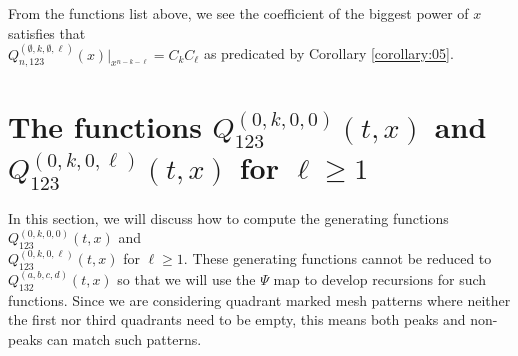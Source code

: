\documentclass[
final,nomarks
]{dmtcs-episciences}
\newcommand{\coref}[1]{Corollary \ref{corollary:#1}}
\newcommand{\Qmm}[1]{Q_{132}^{(#1)}(t,x)}
\newcommand{\Qm}[1]{Q_{123}^{(#1)}(t,x)}
\newcommand{\Qmn}[2]{Q_{#2,123}^{(#1)}(x)}
\begin{document}
From the functions list above, we see the coefficient of the biggest power of \begin{math}x\end{math} satisfies that\\ \begin{math}\Qmn{\emptyset,k,\emptyset,\ell}{n}\big\vert_{x^{n-k-\ell}}=C_k C_\ell\end{math} as predicated by \coref{05}.






\section{The functions \(\Qm{0,k,0,0}\) and \(\Qm{0,k,0,\ell}\) for \(\ell\geq 1\)}
In this section, we will discuss how to compute the generating functions 
\begin{math}\Qm{0,k,0,0}\end{math} and\\
\begin{math}\Qm{0,k,0,\ell}\end{math} for \begin{math}\ell\geq 1\end{math}. These generating functions 
cannot be reduced to \begin{math}\Qmm{a,b,c,d}\end{math} so that we will use the \begin{math}\Psi\end{math} map to 
develop recursions for such functions. Since we are considering 
quadrant marked mesh patterns where neither the first nor third quadrants need to be empty, 
this means both peaks and non-peaks can match such patterns. 
\end{document}
